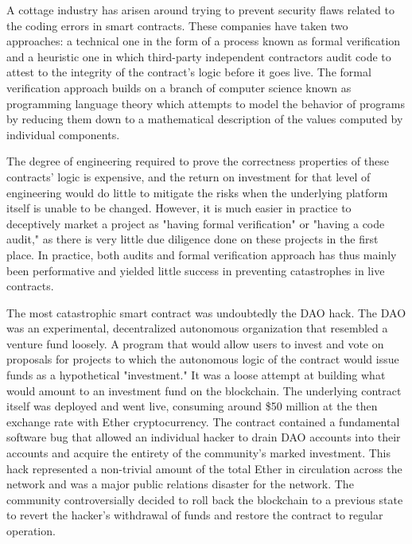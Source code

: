 A cottage industry has arisen around trying to prevent security flaws related to
the coding errors in smart contracts. These companies have taken two approaches:
a technical one in the form of a process known as formal verification and a
heuristic one in which third-party independent contractors audit code to attest
to the integrity of the contract's logic before it goes live. The formal
verification approach builds on a branch of computer science known as
programming language theory which attempts to model the behavior of programs by
reducing them down to a mathematical description of the values computed by
individual components.


The degree of engineering required to prove the correctness properties of these
contracts' logic is expensive, and the return on investment for that level of
engineering would do little to mitigate the risks when the underlying platform
itself is unable to be changed. However, it is much easier in practice to
deceptively market a project as "having formal verification" or "having a code
audit," as there is very little due diligence done on these projects in the
first place. In practice, both audits and formal verification approach has thus
mainly been performative and yielded little success in preventing catastrophes
in live contracts.

The most catastrophic smart contract was undoubtedly the DAO hack. The DAO was
an experimental, decentralized autonomous organization that resembled a venture
fund loosely. A program that would allow users to invest and vote on proposals
for projects to which the autonomous logic of the contract would issue funds as
a hypothetical "investment." It was a loose attempt at building what would
amount to an investment fund on the blockchain. The underlying contract itself
was deployed and went live, consuming around \$50 million at the then exchange
rate with Ether cryptocurrency. The contract contained a fundamental software
bug that allowed an individual hacker to drain DAO accounts into their accounts
and acquire the entirety of the community's marked investment. This hack
represented a non-trivial amount of the total Ether in circulation across the
network and was a major public relations disaster for the network. The community
controversially decided to roll back the blockchain to a previous state to
revert the hacker's withdrawal of funds and restore the contract to regular
operation. \cite{secDao}


